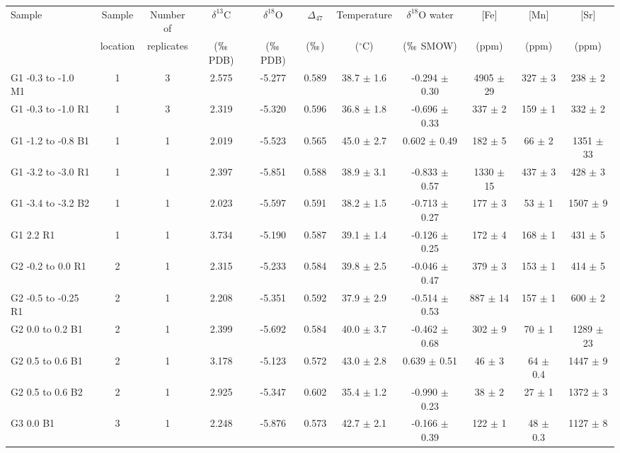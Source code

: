 \documentclass{article}
\newcommand{\deltao}{$\delta^{18}$}
\newcommand{\deltac}{$\delta^{13}$}
\newcommand{\degrees}{$^{\circ}$}
\begin{document}
\begin{sidewaystable}[htbp]
\centering
\small
\begin{tabular}{ | l | c | c | c | c | c | c | c | c | c | c | }
\multirow{2}{*}{Sample} & Sample & Number of & \deltac C & \deltao O & $\Delta_{47}$ & Temperature & \deltao O water & [Fe] & [Mn] & [Sr] \\
 & location & replicates & ($\permil$ PDB) & ($\permil$ PDB) & ($\permil$) & (\degrees C) & ($\permil$ SMOW) & (ppm) & (ppm) & (ppm)\\ \hline
G1 -0.3 to -1.0 M1 & 1 & 3 & 2.575 & -5.277 & 0.589 & 38.7 $\pm$ 1.6 & -0.294 $\pm$ 0.30 & 4905 $\pm$ 29 & 327 $\pm$ 3 & 238 $\pm$ 2 \\
G1 -0.3 to -1.0 R1 & 1 & 3 & 2.319 & -5.320 & 0.596 & 36.8 $\pm$ 1.8 & -0.696 $\pm$ 0.33 & 337 $\pm$ 2 & 159 $\pm$ 1 & 332 $\pm$ 2 \\
G1 -1.2 to -0.8 B1 & 1 & 1 & 2.019 & -5.523 & 0.565 & 45.0 $\pm$ 2.7 & 0.602 $\pm$ 0.49 & 182 $\pm$ 5 & 66 $\pm$ 2 & 1351 $\pm$ 33 \\
G1 -3.2 to -3.0 R1 & 1 & 1 & 2.397 & -5.851 & 0.588 & 38.9 $\pm$ 3.1 & -0.833 $\pm$ 0.57 & 1330 $\pm$ 15 & 437 $\pm$ 3 & 428 $\pm$ 3 \\
G1 -3.4 to -3.2 B2 & 1 & 1 & 2.023 & -5.597 & 0.591 & 38.2 $\pm$ 1.5 & -0.713 $\pm$ 0.27 & 177 $\pm$ 3 & 53 $\pm$ 1 & 1507 $\pm$ 9 \\
G1 2.2 R1 & 1 & 1 & 3.734 & -5.190 & 0.587 & 39.1 $\pm$ 1.4 & -0.126 $\pm$ 0.25 & 172 $\pm$ 4 & 168 $\pm$ 1 & 431 $\pm$ 5 \\
G2 -0.2 to 0.0 R1 & 2 & 1 & 2.315 & -5.233 & 0.584 & 39.8 $\pm$ 2.5 & -0.046 $\pm$ 0.47 & 379 $\pm$ 3 & 153 $\pm$ 1 & 414 $\pm$ 5 \\
G2 -0.5 to -0.25 R1 & 2 & 1 & 2.208 & -5.351 & 0.592 & 37.9 $\pm$ 2.9 & -0.514 $\pm$ 0.53 & 887 $\pm$ 14 & 157 $\pm$ 1 & 600 $\pm$ 2 \\
G2 0.0 to 0.2 B1 & 2 & 1 & 2.399 & -5.692 & 0.584 & 40.0 $\pm$ 3.7 & -0.462 $\pm$ 0.68 & 302 $\pm$ 9 & 70 $\pm$ 1 & 1289 $\pm$ 23 \\
G2 0.5 to 0.6 B1 & 2 & 1 & 3.178 & -5.123 & 0.572 & 43.0 $\pm$ 2.8 & 0.639 $\pm$ 0.51 & 46 $\pm$ 3 & 64 $\pm$ 0.4 & 1447 $\pm$ 9 \\
G2 0.5 to 0.6 B2 & 2 & 1 & 2.925 & -5.347 & 0.602 & 35.4 $\pm$ 1.2 & -0.990 $\pm$ 0.23 & 38 $\pm$ 2 & 27 $\pm$ 1 & 1372 $\pm$ 3 \\
G3 0.0 B1 & 3 & 1 & 2.248 & -5.876 & 0.573 & 42.7 $\pm$ 2.1 & -0.166 $\pm$ 0.39 & 122 $\pm$ 1 & 48 $\pm$ 0.3 & 1127 $\pm$ 8 \\

\end{tabular}
\end{sidewaystable}
\end{document}
